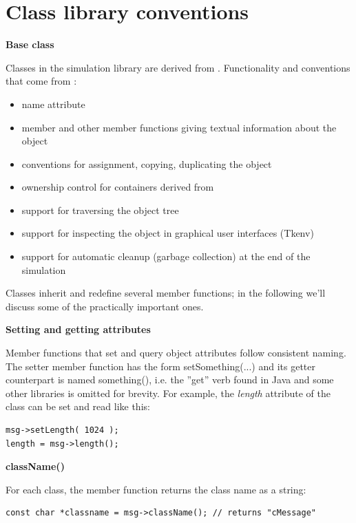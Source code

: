 \section{Class library conventions}

\textbf{Base class}


Classes in the {\opp} simulation library are derived from .
Functionality and conventions that come from :
\begin{itemize}
  \item{name attribute}
  \item{ member and other member functions giving textual
    information about the object}
  \item{conventions for assignment, copying, duplicating the object}
  \item{ownership control for containers derived from }
  \item{support for traversing the object tree}
  \item{support for inspecting the object in graphical user interfaces
    (Tkenv)}
  \item{support for automatic cleanup (garbage collection) at the end
    of the simulation}
\end{itemize}


Classes inherit and redefine several  member functions;
in the following we'll discuss some of the practically important
ones.


\textbf{Setting and getting attributes}


Member functions that set and query object attributes follow
consistent naming. The setter member function has the form setSomething(...)
and its getter counterpart is named something(), i.e. the ''get''
verb found in Java and some other libraries is omitted for brevity.
For example, the \textit{length} attribute of the  class can
be set and read like this:

\begin{verbatim}
msg->setLength( 1024 );
length = msg->length();
\end{verbatim}


\textbf{className()}


For each class, the  member function returns the class
name as a string:

\begin{verbatim}
const char *classname = msg->className(); // returns "cMessage"
\end{verbatim}

